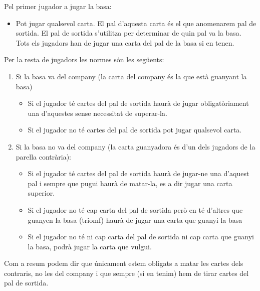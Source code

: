 Pel primer jugador a jugar la basa:

\begin{itemize}
    \item{Pot jugar qualsevol carta. El pal d'aquesta carta és el que anomenarem pal de sortida. El pal de sortida s'utilitza per determinar de quin pal va la basa. Tots els jugadors han de jugar una carta del pal de la basa si en tenen.  }
\end{itemize}

Per la resta de jugadors les normes són les següents:
\begin{enumerate}
\item{Si la basa va del company (la carta del company és la que està guanyant la basa)
    \begin{itemize}
        \item{Si el jugador té cartes del pal de sortida haurà de jugar obligatòriament una d'aquestes sense necessitat de superar-la.}
        \item{Si el jugador no té cartes del pal de sortida pot jugar qualsevol carta.}
     \end{itemize}
}   
\item{Si la basa no va del company (la carta guanyadora és d'un dels jugadors de la parella contrària):
    \begin{itemize}
        \item{Si el jugador té cartes del pal de sortida haurà de jugar-ne una d'aquest pal i sempre que pugui haurà de matar-la, es a dir jugar una carta superior.}
        \item{Si el jugador no té cap carta del pal de sortida però en té d'altres que guanyen la basa (triomf) haurà de jugar una carta que guanyi la basa}
        \item{Si el jugador no té ni cap carta del pal de sortida ni cap carta que guanyi la basa, podrà jugar la carta que vulgui.}
    \end{itemize}
}
\end{enumerate}
Com a resum podem dir que únicament estem obligats a matar les cartes dels contraris, no les del company i que sempre (si en tenim) hem de tirar cartes del pal de sortida.

